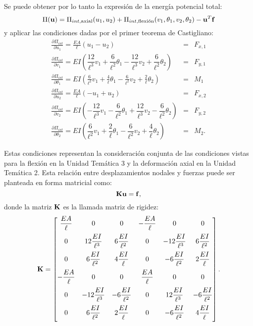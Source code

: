 Se puede obtener por lo tanto la expresión de la energía potencial total:
%
\begin{equation}
\Pi ({\bf u}) =  \Pi_{int,\text{axial}}(u_1,u_2) + \Pi_{int,\text{flexión}}(v_1,\theta_1,v_2,\theta_2) - {\bf u}^T {\bf f}
\end{equation}
%
y aplicar las condiciones dadas por el primer teorema de Castigliano:
%
\begin{eqnarray}
\frac{\partial \Pi_{int} }{\partial u_1} = \frac{EA}{\ell} (u_1 - u_2) &=& F_{x,1} \\
%
\frac{\partial \Pi_{int} }{\partial v_1} = EI \left( \dfrac{12}{\ell^{3}} v_1 + \dfrac{6}{\ell^{2}} \theta_1 - \dfrac{12}{\ell^{3}} v_2 + \dfrac{6}{\ell^{2}} \theta_2 \right)  &=& F_{y,1} \\
%
\frac{\partial \Pi_{int} }{\partial \theta_1} = EI \left( \frac{6}{\ell^2} v_1 +  \frac{4}{\ell} \theta_1 - \frac{6}{\ell^2} v_2   + \frac{2}{\ell} \theta_2 \right) &=& M_1 \\
\frac{\partial  \Pi_{int} }{\partial u_2} = \frac{EA}{\ell} (-u_1 + u_2) &=& F_{x,2} \\
%
\frac{\partial \Pi_{int} }{\partial v_2} = EI \left( -\dfrac{12}{\ell^{3}} v_1 - \dfrac{6}{\ell^{2}} \theta_1 +\dfrac{12}{\ell^{3}} v_2 - \dfrac{6}{\ell^{2}} \theta_2 \right) &=& F_{y,2} \\
%
\frac{\partial \Pi_{int} }{\partial \theta_2} = EI \left( \dfrac{6}{\ell^{2}} v_1 + \dfrac{2}{\ell} \theta_1 - \dfrac{6}{\ell^{2}} v_2 + \dfrac{4}{\ell}  \theta_2 \right) &=& M_2.
\end{eqnarray}

Estas condiciones representan la consideración conjunta de las condiciones vistas para la flexión en la Unidad Temática 3 y la deformación axial en la Unidad Temática 2.
%
Esta relación entre desplazamientos nodales y fuerzas puede ser planteada en forma matricial como:
%
\begin{equation}\label{eqn:eqrig}
{\bf K} {\bf u} = {\bf f},
\end{equation}
%
donde la matriz ${\bf K}$ es la llamada matriz de rigidez:
%
\begin{equation}
\bfK = \left[
\begin{matrix}
\dfrac{EA}{\ell} & 0 & 0 & - \dfrac{EA}{\ell} & 0 & 0 \\[3mm]
%
0 &  12 \dfrac{EI}{\ell^{3}} & 6 \dfrac{EI}{\ell^{2}} &  0& -12 \dfrac{EI}{\ell^{3}} & 6 \dfrac{EI}{\ell^{2}} \\[3mm]
0 &  6 \dfrac{EI}{\ell^{2}} & 4 \dfrac{EI}{\ell} & 0& -6 \dfrac{EI}{\ell^{2}} & 2 \dfrac{EI}{\ell} \\[3mm]
-\dfrac{EA}{\ell} & 0 & 0 &  \dfrac{EA}{\ell} & 0 & 0 \\[3mm]
%
0 &  -12 \dfrac{EI}{\ell^{3}} & -6 \dfrac{EI}{\ell^{2}} &0&  12 \dfrac{EI}{\ell^{3}} & -6 \dfrac{EI}{\ell^{2}} \\[3mm]
0 &  6 \dfrac{EI}{\ell^{2}} & 2 \dfrac{EI}{\ell} & 0 & -6 \dfrac{EI}{\ell^{2}} & 4 \dfrac{EI}{\ell} \\[3mm]
\end{matrix}
\right].
\end{equation}


